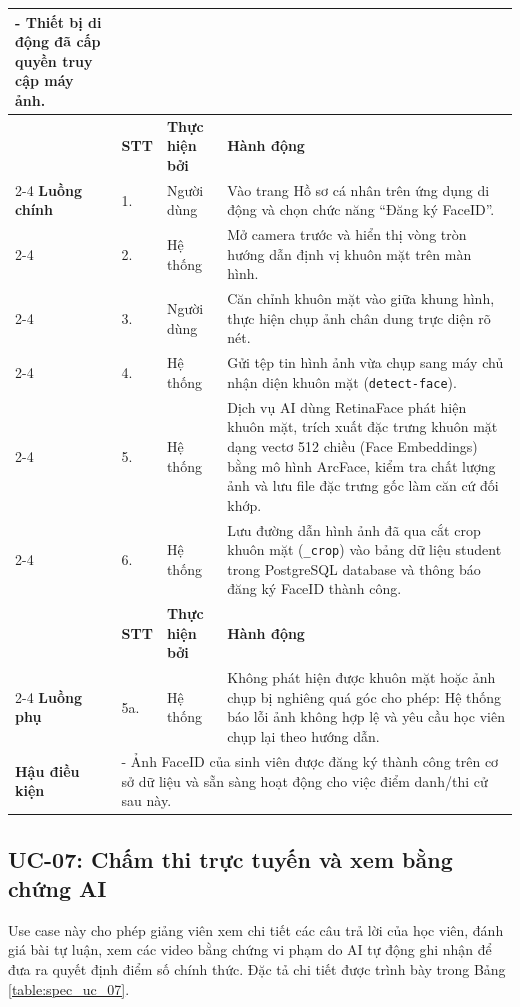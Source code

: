 \documentclass[../DoAn.tex]{subfiles}
\begin{document}
\begin{longtable}{|p{2.8cm}|p{0.8cm}|p{2.2cm}|p{7.5cm}|}
{      - Thiết bị di động đã cấp quyền truy cập máy ảnh.} \\ \hline
     & \textbf{STT} & \textbf{Thực hiện bởi} & \textbf{Hành động} \\ \cline{2-4}
    \textbf{Luồng chính} & 1. & Người dùng & Vào trang Hồ sơ cá nhân trên ứng dụng di động và chọn chức năng ``Đăng ký FaceID''. \\ \cline{2-4}
     & 2. & Hệ thống & Mở camera trước và hiển thị vòng tròn hướng dẫn định vị khuôn mặt trên màn hình. \\ \cline{2-4}
     & 3. & Người dùng & Căn chỉnh khuôn mặt vào giữa khung hình, thực hiện chụp ảnh chân dung trực diện rõ nét. \\ \cline{2-4}
     & 4. & Hệ thống & Gửi tệp tin hình ảnh vừa chụp sang máy chủ nhận diện khuôn mặt (\mbox{\texttt{detect-face}}). \\ \cline{2-4}
     & 5. & Hệ thống & Dịch vụ AI dùng RetinaFace phát hiện khuôn mặt, trích xuất đặc trưng khuôn mặt dạng vectơ 512 chiều (Face Embeddings) bằng mô hình ArcFace, kiểm tra chất lượng ảnh và lưu file đặc trưng gốc làm căn cứ đối khớp. \\ \cline{2-4}
     & 6. & Hệ thống & Lưu đường dẫn hình ảnh đã qua cắt crop khuôn mặt (\mbox{\texttt{\_crop}}) vào bảng dữ liệu student trong PostgreSQL database và thông báo đăng ký FaceID thành công. \\ \hline
     & \textbf{STT} & \textbf{Thực hiện bởi} & \textbf{Hành động} \\ \cline{2-4}
    \textbf{Luồng phụ} & 5a. & Hệ thống & Không phát hiện được khuôn mặt hoặc ảnh chụp bị nghiêng quá góc cho phép: Hệ thống báo lỗi ảnh không hợp lệ và yêu cầu học viên chụp lại theo hướng dẫn. \\ \hline
    \textbf{Hậu điều kiện} & \multicolumn{3}{p{10.9cm}|}{- Ảnh FaceID của sinh viên được đăng ký thành công trên cơ sở dữ liệu và sẵn sàng hoạt động cho việc điểm danh/thi cử sau này.} \\ \hline
\end{longtable}

\subsection{UC-07: Chấm thi trực tuyến và xem bằng chứng AI}

\label{subsection:spec_uc_07}

Use case này cho phép giảng viên xem chi tiết các câu trả lời của học viên, đánh giá bài tự luận, xem các video bằng chứng vi phạm do AI tự động ghi nhận để đưa ra quyết định điểm số chính thức. Đặc tả chi tiết được trình bày trong Bảng \ref{table:spec_uc_07}.
\end{document}
